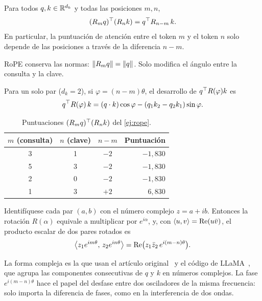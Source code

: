 \begin{teorema}\label{teo:rope}
Para todos $q,k\in\mathbb{R}^{d_k}$ y todas las posiciones $m,n$,
\[
(R_mq)^{\top}(R_nk)=q^{\top} R_{n-m}\,k.
\]
En particular, la puntuación de atención entre el token $m$ y el token $n$ solo depende de las posiciones a través de la diferencia $n-m$.
\end{teorema}

\begin{corolario}\label{cor:rope-norma}
RoPE conserva las normas: $\lVert R_mq\rVert=\lVert q\rVert$. Solo modifica el ángulo entre la consulta y la clave.
\end{corolario}

Para un solo par ($d_k=2$), si $\varphi=(n-m)\theta$, el desarrollo de $q^{\top} R(\varphi)k$ es
\begin{equation}\label{eq:rope2d}
q^{\top} R(\varphi)\,k=(q\cdot k)\cos\varphi-(q_1k_2-q_2k_1)\sin\varphi .
\end{equation}

\addtocounter{definicion}{1}%

\begin{table}[ht]
\centering\small
\caption{Puntuaciones $(R_mq)^{\top}(R_nk)$ del \cref{ej:rope}.}\label{tab:rope}
\begin{tabular}{@{}cccr@{}}
\toprule
$m$ (consulta) & $n$ (clave) & $n-m$ & Puntuación \\
\midrule
3 & 1 & $-2$ & $-1{,}830$ \\
5 & 3 & $-2$ & $-1{,}830$ \\
2 & 0 & $-2$ & $-1{,}830$ \\
1 & 3 & $+2$ & $6{,}830$ \\
\bottomrule
\end{tabular}
\end{table}

\begin{proposicion}\label{prop:rope-compleja}
Identifíquese cada par $(a,b)$ con el número complejo $z=a+ib$. Entonces la rotación $R(\alpha)$ equivale a multiplicar por $e^{i\alpha}$, y, con $\langle u,v\rangle=\operatorname{Re}(u\bar v)$, el producto escalar de dos pares rotados es
\[
\bigl\langle z_1e^{im\theta},\,z_2e^{in\theta}\bigr\rangle=\operatorname{Re}\bigl(z_1\bar z_2\,e^{i(m-n)\theta}\bigr).
\]
\end{proposicion}

La forma compleja es la que usan el artículo original~\cite[§3.2.1]{roformer} y el código de LLaMA~\cite{llamacode}, que agrupa las componentes consecutivas de $q$ y $k$ en números complejos. La fase $e^{i(m-n)\theta}$ hace el papel del desfase entre dos osciladores de la misma frecuencia: solo importa la diferencia de fases, como en la interferencia de dos ondas.

